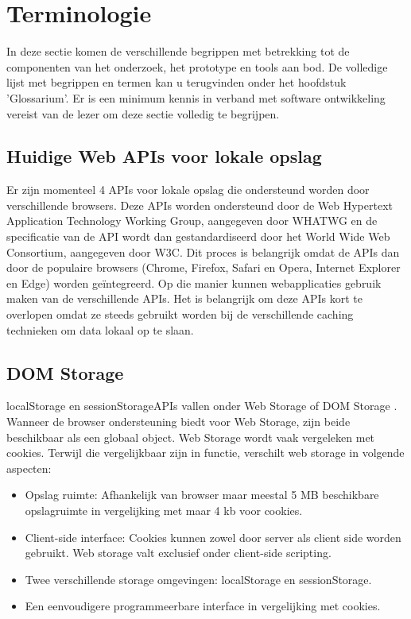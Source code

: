 \section{Terminologie}
\label{sec:terminologie}
In deze sectie komen de verschillende begrippen met betrekking tot de componenten van het onderzoek, het prototype en tools aan bod. De volledige lijst met begrippen en termen kan u terugvinden onder het hoofdstuk 'Glossarium'. Er is een minimum kennis in verband met software ontwikkeling vereist van de lezer om deze sectie volledig te begrijpen.
\subsection{Huidige Web APIs voor lokale opslag}
Er zijn momenteel 4 APIs \autocite{mozilla-overview} voor lokale opslag die ondersteund worden door verschillende browsers. Deze APIs worden ondersteund \autocite{WHATWG-storage-API} door de Web Hypertext Application Technology Working Group, aangegeven door WHATWG en de specificatie van de API wordt dan gestandardiseerd door het World Wide Web Consortium, aangegeven door W3C. Dit proces is belangrijk omdat de APIs dan door de populaire browsers (Chrome, Firefox, Safari en Opera, Internet Explorer en Edge) worden ge\"integreerd. Op die manier kunnen webapplicaties gebruik maken van de verschillende APIs. Het is belangrijk om deze APIs kort te overlopen omdat ze steeds gebruikt worden bij de verschillende caching technieken om data lokaal op te slaan.
\subsection{DOM Storage}
localStorage en sessionStorageAPIs vallen onder Web Storage of DOM Storage \autocite{clientside-storage}. Wanneer de browser ondersteuning biedt voor Web Storage, zijn beide beschikbaar als een globaal object. Web Storage wordt vaak vergeleken met cookies. Terwijl die vergelijkbaar zijn in functie, verschilt web storage in volgende aspecten: 
\begin{itemize}  
\item Opslag ruimte: Afhankelijk van browser maar meestal 5 MB beschikbare opslagruimte in vergelijking met maar 4 kb voor cookies.
\item Client-side interface: Cookies kunnen zowel door server als client side worden gebruikt. Web storage valt exclusief onder client-side scripting.
\item Twee verschillende storage omgevingen: localStorage en sessionStorage.
\item Een eenvoudigere programmeerbare interface in vergelijking met cookies.
\end{itemize}
\clearpage
